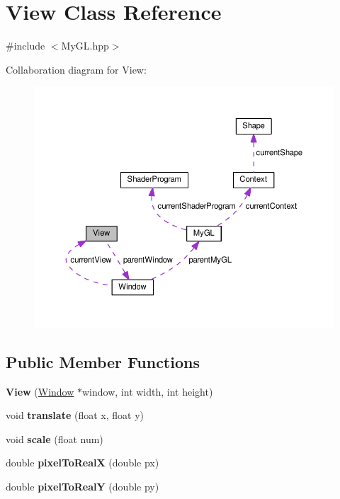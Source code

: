 \hypertarget{classView}{}\section{View Class Reference}
\label{classView}


{\ttfamily \#include $<$My\+G\+L.\+hpp$>$}



Collaboration diagram for View\+:
\nopagebreak
\begin{figure}[H]
\begin{center}
\leavevmode
\includegraphics[width=350pt]{classView__coll__graph}
\end{center}
\end{figure}
\subsection*{Public Member Functions}
\begin{DoxyCompactItemize}
\item 
\hypertarget{classView_a8e2813e8beabcfee72e2ec2e05fd72bb}{}{\bfseries View} (\hyperlink{classWindow}{Window} $\ast$window, int width, int height)\label{classView_a8e2813e8beabcfee72e2ec2e05fd72bb}

\item 
\hypertarget{classView_a2e97f6058d6a6690d9db72ceb43478a4}{}void {\bfseries translate} (float x, float y)\label{classView_a2e97f6058d6a6690d9db72ceb43478a4}

\item 
\hypertarget{classView_ac31ae2aee1e5374df420b657b3040f6d}{}void {\bfseries scale} (float num)\label{classView_ac31ae2aee1e5374df420b657b3040f6d}

\item 
\hypertarget{classView_ad6c9a0c29d23c21f333b346aa538472a}{}double {\bfseries pixel\+To\+Real\+X} (double px)\label{classView_ad6c9a0c29d23c21f333b346aa538472a}

\item 
\hypertarget{classView_adc37e8999407e00288c7ef8e36d7bea1}{}double {\bfseries pixel\+To\+Real\+Y} (double py)\label{classView_adc37e8999407e00288c7ef8e36d7bea1}

\end{DoxyCompactItemize}
